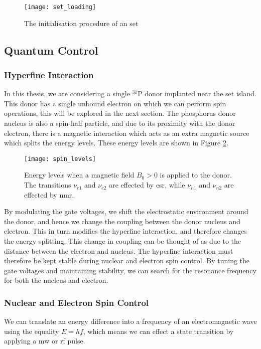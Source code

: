 	\begin{figure}[htbp!]
		\centering
		\texttt{[image: set\_loading]}
		\caption[The initiliasation prodedure]{The initialisation procedure of an \gls{set}\cite{morello2010single}}
		\label{fig::set_loading}
	\end{figure}
	
\subsection{Quantum Control}
	\subsubsection{Hyperfine Interaction}
		In this thesis, we are considering a single $^{31}$P donor implanted near the \gls{set} island. This donor has a single unbound electron on which we can perform spin operations, this will be explored in the next section. The phosphorus donor nucleus is also a spin-half particle, and due to its proximity with the donor electron, there is a magnetic interaction which acts as an extra magnetic source which splits the energy levels. These energy levels are shown in Figure \ref{fig::spin_levels}.
		\begin{figure}[htbp]
			\centering
			\texttt{[image: spin\_levels]}
			\caption[Energy levels of a $^{31}$P and electron spin system under magnetic bias.]{Energy levels when a magnetic field $B_0 > 0$ is applied to the donor. The transitions $\nu_{e1}$ and $\nu_{e2}$ are effected by \gls{esr}, while $\nu_{n1}$ and $\nu_{n2}$ are effected by \gls{nmr}.} 
			\label{fig::spin_levels}
		\end{figure}
		
		By modulating the gate voltages, we shift the electrostatic environment around the donor, and hence we change the coupling between the donor nucleus and electron. This in turn modifies the hyperfine interaction, and therefore changes the energy splitting. This change in coupling can be thought of as due to the distance between the electron and nucleus.
		The hyperfine interaction must therefore be kept stable during nuclear and electron spin control. By tuning the gate voltages and maintaining stability, we can search for the resonance frequency for both the nucleus and electron. 
	\subsubsection{Nuclear and Electron Spin Control}
		\label{sec::nuc_spin_map}
		We can translate an energy difference into a frequency of an electromagnetic wave using the equality $E = h f$, which means we can effect a state transition by applying a \gls{mw} or \gls{rf} pulse.
		

